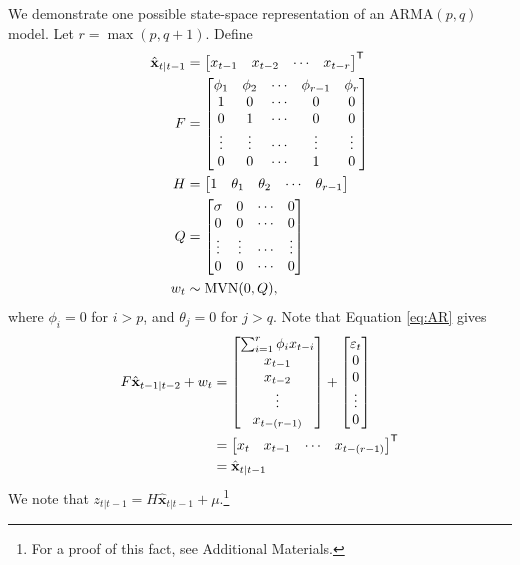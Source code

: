 We demonstrate one possible state-space representation of an $\text{ARMA}(p,q)$ model. Let
$r = \max(p,q+1)$. Define
\begin{align}
    \hat{\textbf{x}}_{t|t-1}&=\begin{bmatrix}x_{t-1}&x_{t-2}&\dotsb&x_{t-r}\end{bmatrix}^{\mathsf T} \\
    F &= \begin{bmatrix}
        \phi_1 & \phi_2 & \cdots & \phi_{r-1} & \phi_r\\
        1 & 0 & \cdots & 0 & 0\\
        0 & 1 & \cdots & 0 & 0\\
        \vdots & \vdots & \cdots & \vdots & \vdots\\
        0 & 0 & \cdots & 1 & 0
    \end{bmatrix}\\
    H &= \begin{bmatrix}
        1 & \theta_1 & \theta_2 & \cdots & \theta_{r-1}
    \end{bmatrix}\\
    Q &= \begin{bmatrix}
        \sigma & 0 & \cdots & 0\\
        0 & 0 & \cdots & 0\\
        \vdots & \vdots & \cdots & \vdots\\
        0 & 0 & \cdots & 0
    \end{bmatrix}\\
    w_t &\sim \text{MVN}(0, Q),
    \label{eqn:error}
\end{align}
where $\phi_i = 0$ for $i>p$, and $\theta_j = 0$ for $j > q$.
Note that Equation \ref{eq:AR} gives
\begin{align}
    F\hat{\textbf{x}}_{t-1|t-2}+w_{t}&=\begin{bmatrix}\sum_{i=1}^r\phi_ix_{t-i}\\
                                x_{t-1}\\
                                x_{t-2}\\
                                \vdots\\
                                x_{t-(r-1)}
                  \end{bmatrix}+\begin{bmatrix}\varepsilon_t\\0\\0\\\vdots\\0\end{bmatrix}\\
                &=\begin{bmatrix}x_t&x_{t-1}&\cdots&x_{t-(r-1)}\end{bmatrix}^{\mathsf T} \\
                &=\hat{\textbf{x}}_{t|t-1}
\end{align}
We note that $z_{t|t-1}=H\hat{\textbf{x}}_{t|t-1}+\mu$.\footnote{
For a proof of this fact, see Additional Materials.}

